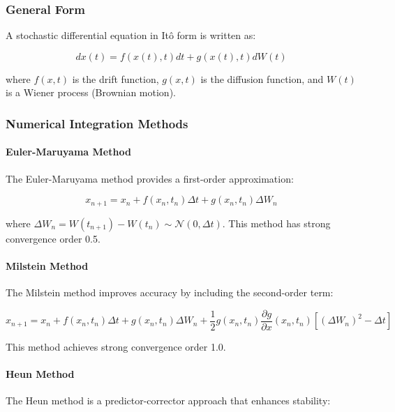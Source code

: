 \subsubsection{General Form}

A stochastic differential equation in Itô form is written as:

\begin{equation}
dx(t) = f(x(t), t) dt + g(x(t), t) dW(t)
\end{equation}

where $f(x,t)$ is the drift function, $g(x,t)$ is the diffusion function, and $W(t)$ is a Wiener process (Brownian motion).

\subsubsection{Numerical Integration Methods}

\paragraph{Euler-Maruyama Method}
The Euler-Maruyama method provides a first-order approximation:

\begin{equation}
x_{n+1} = x_n + f(x_n, t_n) \Delta t + g(x_n, t_n) \Delta W_n
\end{equation}

where $\Delta W_n = W(t_{n+1}) - W(t_n) \sim \mathcal{N}(0, \Delta t)$. This method has strong convergence order 0.5.

\paragraph{Milstein Method}
The Milstein method improves accuracy by including the second-order term:

\begin{equation}
x_{n+1} = x_n + f(x_n, t_n) \Delta t + g(x_n, t_n) \Delta W_n + \frac{1}{2} g(x_n, t_n) \frac{\partial g}{\partial x}(x_n, t_n) [(\Delta W_n)^2 - \Delta t]
\end{equation}

This method achieves strong convergence order 1.0.

\paragraph{Heun Method}
The Heun method is a predictor-corrector approach that enhances stability:

